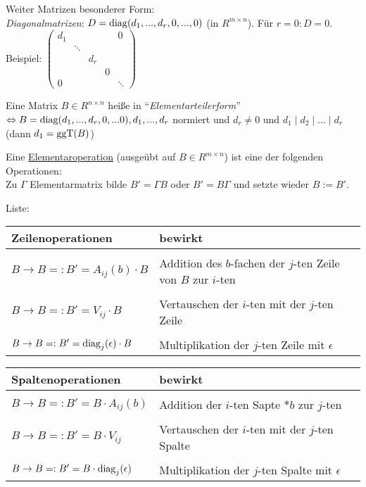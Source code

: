 \documentclass[a4paper,twoside,DIV15,BCOR12mm]{scrbook}
\begin{document}
Weiter Matrizen besonderer Form:\\
\emph{Diagonalmatrizen}: $D = \mathop{\mathrm{diag}}\nolimits(d_1,...,d_r,0,...,0)$ (in $R^{m \times n}$). Für $r = 0: D = 0$.\\
Beispiel: $\begin{pmatrix}d_1 & & & & 0 \\
                              & \ddots & & & \\
                              & & d_r & & \\
                              & & & 0 & \\
                            0 & & & & \ddots\end{pmatrix}$

\begin{bemerkung}
    Eine Matrix $B \in R^{n \times n}$ heiße in "`\emph{Elementarteilerform}"' $\Leftrightarrow B = \mathop{\mathrm{diag}}\nolimits(d_1,...,d_r,0,...0), d_1,...,d_r$ normiert und $d_r \not=0$ und $d_1 \mid d_2 \mid ... \mid d_r$ (dann $d_1 = \mathop{\rm ggT}\nolimits(B)$)
\end{bemerkung}

Eine \underline{Elementaroperation} (ausgeübt auf $B \in R^{m \times n}$) ist eine der folgenden Operationen:\\
Zu $\Gamma$ Elementarmatrix bilde $B' = \Gamma B$ oder $B' =
B\Gamma$ und setzte wieder $B := B'$.

Liste:

\begin{tabular}{l|l}
    Zeilenoperationen & bewirkt \\
    \hline \\
    $B \to B =: B' = A_{ij}(b) \cdot B$        & Addition des $b$-fachen der $j$-ten Zeile von $B$ zur $i$-ten \\
    \hline \\
    $B \to B =: B' = V_{ij} \cdot B$           & Vertauschen der $i$-ten mit der $j$-ten Zeile \\
    \hline \\
    $B \to B =: B' = \mathop{\mathrm{diag}}\nolimits_j(\epsilon) \cdot B$ & Multiplikation der $j$-ten Zeile mit $\epsilon$
\end{tabular}

\begin{tabular}{l|l}
    Spaltenoperationen & bewirkt \\
    \hline \\
    $B \to B =: B' = B \cdot A_{ij}(b)$        & Addition der $i$-ten Sapte $*b$ zur $j$-ten \\
    \hline \\
    $B \to B =: B' = B \cdot V_{ij}$           & Vertauschen der $i$-ten mit der $j$-ten Spalte \\
    \hline \\
    $B \to B =: B' = B \cdot \mathop{\mathrm{diag}}\nolimits_j(\epsilon)$ & Multiplikation der $j$-ten Spalte mit $\epsilon$
\end{tabular}
\end{document}

